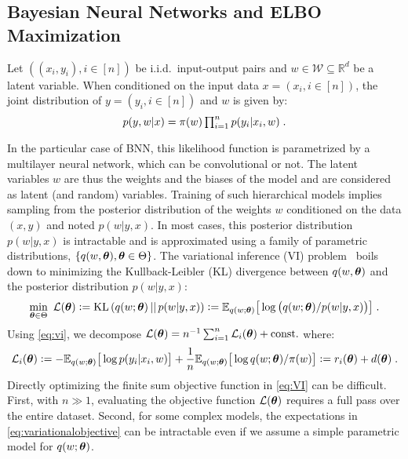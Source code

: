 \documentclass{article} %
\begin{document}
\subsection{Bayesian Neural Networks and ELBO Maximization}
Let $((x_i,y_i),  i \in [n])$ be i.i.d.~input-output pairs and $w \in \mathcal{W} \subseteq \mathbb{R}^{d}$ be a latent variable. When conditioned on the input data $x = (x_i, i \in [n])$, the joint distribution of $y = (y_i, i \in [n])$ and $w$ is given by:
\begin{equation}\label{eq:vi} \textstyle
    p(y,w | x) = \prior(w)\prod_{i=1}^{n}{p(y_i | x_i, w)} \eqsp.
\end{equation}

In the particular case of BNN, this likelihood function is parametrized by a multilayer neural network, which can be convolutional or not.
The latent variables $w$ are thus the weights and the biases of the model and are considered as latent (and random) variables.
Training of such hierarchical models implies sampling from the posterior distribution of the weights $w$ conditioned on the data $(x,y)$ and noted $p(w|y,x)$.
In most cases, this posterior distribution $p(w|y,x)$ is intractable and is approximated using a family of parametric distributions, $\{q(w, \param ), \param \in \Param \}$. 
The variational inference (VI) problem~\citep{blei2017variational} boils down to minimizing the Kullback-Leibler (KL) divergence between $q(w, \param )$ and the posterior distribution $p(w|y,x)$:
\begin{equation} \label{eq:VI}  
\min_{ \param \in \Param }~{\cal L}(\param ) \eqdef \infdiv{q(w; \param )}{p(w|y,x)} \eqdef \EE_{ q( w; \param )} \big[ \log \big( q(w; \param ) / p(w|y,x) \big) \big] \eqsp.
\end{equation}
Using \eqref{eq:vi}, we decompose ${\cal L}(\param) = n^{-1} \sum_{i=1}^{n}{{\cal L}_i(\param)} + {\rm const}.$ where:
\begin{equation}\label{eq:variationalobjective}
{\cal L}_i(\param) \eqdef -\EE_{ q( w; \param )} \big[\log p(y_i | x_i, w) \big]+  \frac{1}{n} \EE_{ q( w; \param )} \big[ \log q(w; \param )/\prior(w) \big] \eqdef r_i(\param) + d(\param) \eqsp.
\end{equation}
Directly optimizing the finite sum objective function in \eqref{eq:VI} can be difficult.
First, with $n \gg 1$, evaluating the objective function ${\cal L}( \param )$ requires a full pass over the entire dataset.
Second, for some complex models, the expectations in \eqref{eq:variationalobjective} can be intractable even if we assume a simple parametric model for $q(w; \param)$.
\end{document}
